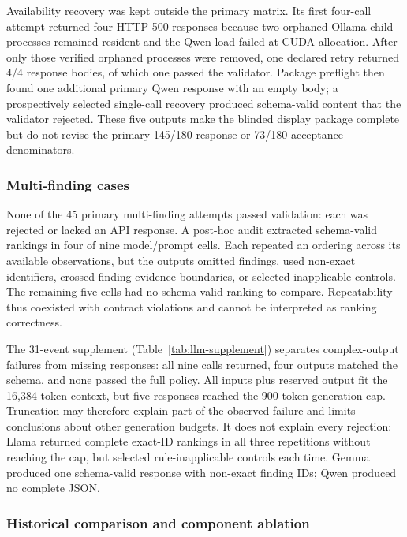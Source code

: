 \documentclass[11pt,a4paper,onecolumn]{IEEEtran}
\begin{document}
Availability recovery was kept outside the primary matrix. Its first four-call attempt returned four HTTP 500 responses because two orphaned Ollama child processes remained resident and the Qwen load failed at CUDA allocation. After only those verified orphaned processes were removed, one declared retry returned 4/4 response bodies, of which one passed the validator. Package preflight then found one additional primary Qwen response with an empty body; a prospectively selected single-call recovery produced schema-valid content that the validator rejected. These five outputs make the blinded display package complete but do not revise the primary 145/180 response or 73/180 acceptance denominators.

\subsubsection{Multi-finding cases}

None of the 45 primary multi-finding attempts passed validation: each was rejected or lacked an API response. A post-hoc audit extracted schema-valid rankings in four of nine model/prompt cells. Each repeated an ordering across its available observations, but the outputs omitted findings, used non-exact identifiers, crossed finding-evidence boundaries, or selected inapplicable controls. The remaining five cells had no schema-valid ranking to compare. Repeatability thus coexisted with contract violations and cannot be interpreted as ranking correctness.

The 31-event supplement (Table~\ref{tab:llm-supplement}) separates complex-output failures from missing responses: all nine calls returned, four outputs matched the schema, and none passed the full policy. All inputs plus reserved output fit the 16,384-token context, but five responses reached the 900-token generation cap. Truncation may therefore explain part of the observed failure and limits conclusions about other generation budgets. It does not explain every rejection: Llama returned complete exact-ID rankings in all three repetitions without reaching the cap, but selected rule-inapplicable controls each time. Gemma produced one schema-valid response with non-exact finding IDs; Qwen produced no complete JSON.



\subsubsection{Historical comparison and component ablation}
\end{document}

